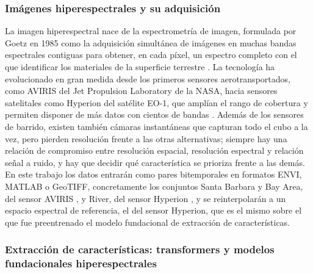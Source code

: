 \subsubsection{Imágenes hiperespectrales y su adquisición}

La imagen hiperespectral nace de la espectrometría de imagen, formulada por Goetz en 1985 como la adquisición simultánea de imágenes en muchas bandas espectrales contiguas para obtener, en cada píxel, un espectro completo con el que identificar los materiales de la superficie terrestre \parencite{goetz1985imaging}. La tecnología ha evolucionado en gran medida desde los primeros sensores aerotransportados, como AVIRIS del Jet Propulsion Laboratory de la NASA, hacia sensores satelitales como Hyperion del satélite EO-1, que amplían el rango de cobertura y permiten disponer de más datos con cientos de bandas \parencite{bhargava2024hyperspectral}. Además de los sensores de barrido, existen también cámaras instantáneas que capturan todo el cubo a la vez, pero pierden resolución frente a las otras alternativas; siempre hay una relación de compromiso entre resolución espacial, resolución espectral y relación señal a ruido, y hay que decidir qué característica se prioriza frente a las demás. En este trabajo los datos entrarán como pares bitemporales en formatos ENVI, MATLAB o GeoTIFF, concretamente los conjuntos Santa Barbara y Bay Area, del sensor AVIRIS \parencite{hasanlou2018hyperspectral}, y River, del sensor Hyperion \parencite{wang2019getnet}, y se reinterpolarán a un espacio espectral de referencia, el del sensor Hyperion, que es el mismo sobre el que fue preentrenado el modelo fundacional de extracción de características.

\subsubsection{Extracción de características: transformers y modelos fundacionales hiperespectrales}

